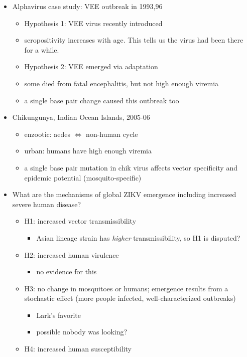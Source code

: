 \documentclass{article}
\begin{document}
\begin{itemize}
\begin{itemize}
        \end{itemize}
        \item Alphavirus case study: VEE outbreak in 1993,96
        \begin{itemize}
            \item Hypothesis 1: VEE virus recently introduced
            \item seropositivity increases with age.  This tells us the virus had been there for a while.
            \item Hypothesis 2: VEE emerged via adaptation
            \item some died from fatal encephalitis, but not high enough viremia
            \item a single base pair change caused this outbreak too
        \end{itemize}
        \item Chikungunya, Indian Ocean Islands, 2005-06
        \begin{itemize}
            \item enzootic: aedes $\iff$ non-human cycle
            \item urban: humans have high enough viremia
            \item a single base pair mutation in chik virus affects vector specificity and epidemic potential (mosquito-specific)
        \end{itemize}
        \item What are the mechanisms of global ZIKV emergence including increased severe human disease?
        \begin{itemize}
            \item H1: increased vector transmissibility
            \begin{itemize}
                \item Asian lineage strain has \emph{higher} transmissibility, so H1 is disputed?
            \end{itemize}
            \item H2: increased human virulence
            \begin{itemize}
                \item no evidence for this
            \end{itemize}
            \item H3: no change in mosquitoes or humans; emergence results from a stochastic effect (more people infected, well-characterized outbreaks)
            \begin{itemize}
                \item Lark's favorite
                \item possible nobody was looking?
            \end{itemize}
            \item H4: increased human susceptibility
        \end{itemize}
    \end{itemize}
\end{document}
